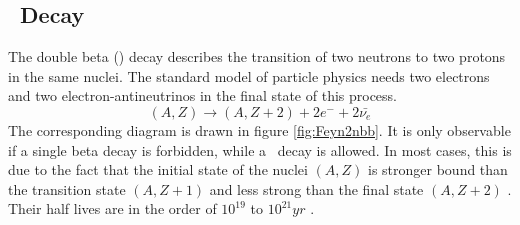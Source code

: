 \documentclass[encoding=utf8,british]{tumphthesis}
\begin{document}



\subsection{\onbb\ Decay}
\label{sec:0nubetabeta}

The double beta (\twonu) decay describes the transition of two neutrons to two protons in the same nuclei.
The standard model of particle physics needs two electrons and two electron-antineutrinos in the final state of this process.
\begin{equation}
(A,Z)\rightarrow (A,Z+2) + 2e^- + 2\bar{\nu_e}
\end{equation} 
The corresponding diagram is drawn in figure \ref{fig:Feyn2nbb}.
It is only observable if a single beta decay is forbidden, while a \twonu\ decay is allowed.
In most cases, this is due to the fact that the initial state of the nuclei $(A,Z)$ is stronger bound than the transition state $(A,Z+1)$ and less strong than the final state $(A,Z+2)$ .
Their half lives are in the order of $10^{19}$ to $10^{21} \unit{yr}$ \cite{shirai_double_2018}.
\\
\end{document}
